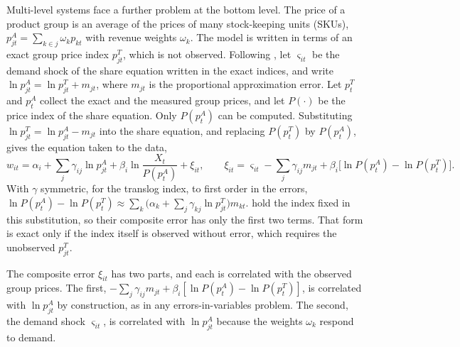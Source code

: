 Multi-level systems face a further problem at the bottom level. The price of a product group is an
average of the prices of many stock-keeping units (SKUs), $p_{jt}^A = \sum_{k\in j}\omega_k p_{kt}$ with
revenue weights $\omega_k$. The model is written in terms of an exact group price index $p_{jt}^T$, which
is not observed. Following \citet[pp.~18--19]{ChaudhuriGoldbergJia2006}, let $\varsigma_{it}$ be the
demand shock of the share equation written in the exact indices, and write $\ln p_{jt}^A = \ln p_{jt}^T +
m_{jt}$, where $m_{jt}$ is the proportional approximation error. Let $p_t^T$ and $p_t^A$ collect the exact
and the measured group prices, and let $P(\cdot)$ be the price index of the share equation. Only $P(p_t^A)$
can be computed. Substituting $\ln p_{jt}^T = \ln p_{jt}^A - m_{jt}$ into the share equation, and replacing
$P(p_t^T)$ by $P(p_t^A)$, gives the equation taken to the data,
\begin{equation}\label{eq:05-meas-error}
  w_{it} = \alpha_i + \sum_j\gamma_{ij}\ln p_{jt}^A + \beta_i\ln\frac{X_t}{P(p_t^A)} + \xi_{it},
  \qquad \xi_{it} = \varsigma_{it} - \sum_j\gamma_{ij}m_{jt} + \beta_i\bigl[\ln P(p_t^A) - \ln P(p_t^T)\bigr].
\end{equation}
With $\gamma$ symmetric, for the translog index, to first order in the errors, $\ln P(p_t^A) - \ln P(p_t^T)
\approx \sum_k\bigl(\alpha_k + \sum_j\gamma_{kj}\ln p_{jt}^T\bigr)m_{kt}$. \citet[p.~19]{ChaudhuriGoldbergJia2006} hold the index fixed in
this substitution, so their composite error has only the first two terms. That form is exact only if the
index itself is observed without error, which requires the unobserved $p_{jt}^T$.

The composite error $\xi_{it}$ has two parts, and each is correlated with the observed group prices. The
first, $-\sum_j\gamma_{ij}m_{jt} + \beta_i[\ln P(p_t^A) - \ln P(p_t^T)]$, is correlated with $\ln p_{jt}^A$ by
construction, as in any errors-in-variables problem. The second, the demand shock $\varsigma_{it}$, is
correlated with $\ln p_{jt}^A$ because the weights $\omega_k$ respond to demand.

